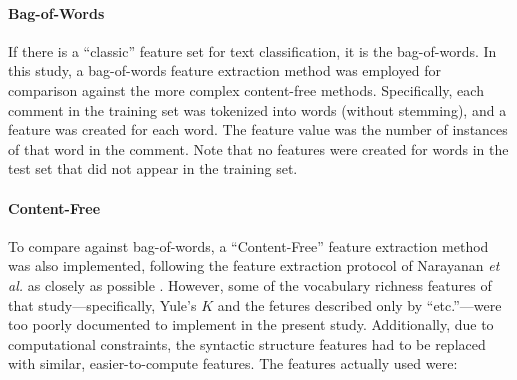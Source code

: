 \documentclass{article}
\begin{document}
\paragraph{Bag-of-Words}
If there is a ``classic'' feature set for text classification, it is the bag-of-words. In this study, a bag-of-words feature extraction method was employed for comparison against the more complex content-free methods. Specifically, each comment in the training set was tokenized into words (without stemming), and a feature was created for each word. The feature value was the number of instances of that word in the comment. Note that no features were created for words in the test set that did not appear in the training set. 

\paragraph{Content-Free}
To compare against bag-of-words, a ``Content-Free'' feature extraction method was also implemented, following the feature extraction protocol of Narayanan \textit{et al.} as closely as possible \cite{narayanan2012feasibility}. However, some of the vocabulary richness features of that study---specifically, Yule's $K$ and the fetures described only by ``etc.''---were too poorly documented to implement in the present study. Additionally, due to computational constraints, the syntactic structure features had to be replaced with similar, easier-to-compute features. The features actually used were:
\end{document}
